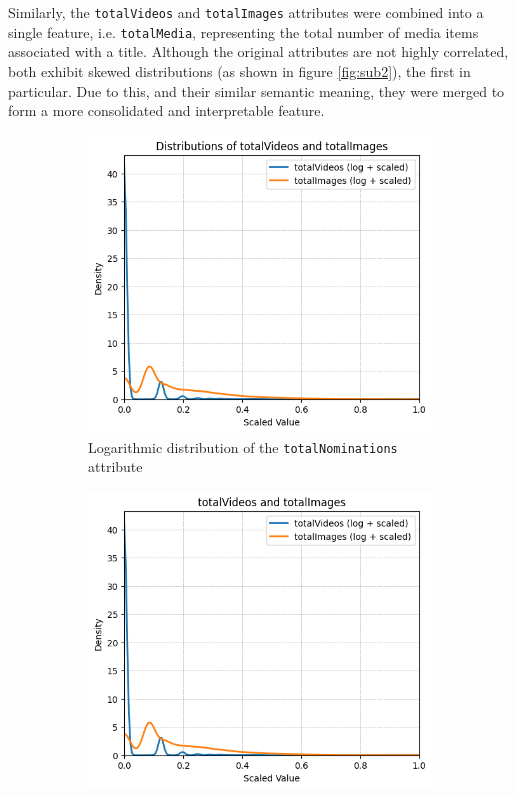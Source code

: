Similarly, the \texttt{totalVideos} and \texttt{totalImages} attributes were combined into a single
feature, i.e. \texttt{totalMedia}, representing the total number of media items associated with a title.
Although the original attributes are not highly correlated, both exhibit skewed distributions (as shown in figure \ref{fig:sub2}), the first in particular.
Due to this, and their similar semantic meaning, they were merged to form a more consolidated and
interpretable feature.

\begin{figure}[H]
    \centering
    \begin{subfigure}{0.48\textwidth}
        \includegraphics[width=\textwidth]{plots/nominations_distrib.png}
        \caption{Logarithmic distribution of the \texttt{totalNominations} attribute}
        \label{fig:sub1}
    \end{subfigure}
    \begin{subfigure}{0.48\textwidth}
        \includegraphics[width=\textwidth]{plots/totalVideos_Images_distrib.png}

\end{subfigure}
\end{figure}
